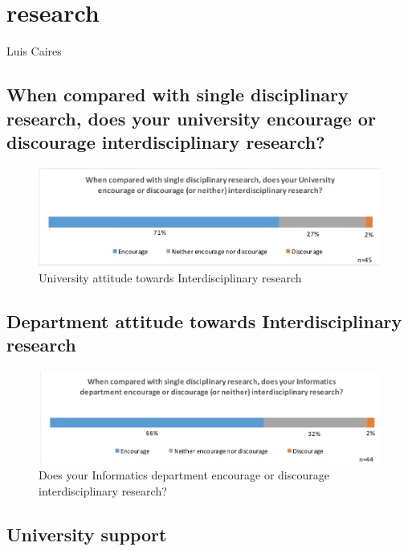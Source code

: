 \section{research}

Luis Caires

\subsection{When compared with single disciplinary research, does your university encourage or discourage interdisciplinary research?}

\begin{figure}[h]
\centering
\includegraphics[width = \linewidth]{charts/1a.jpg}
\caption{University attitude towards Interdisciplinary research}
\label{sect1:Uattitude}
\end{figure}

\subsection{Department attitude towards Interdisciplinary research}


\begin{figure}[h]
\centering
\includegraphics[width = \linewidth]{charts/1b.jpg}
\caption{Does your Informatics department encourage or discourage interdisciplinary research? }
\label{sect1:Dattitude}
\end{figure}

\subsection{University support}

